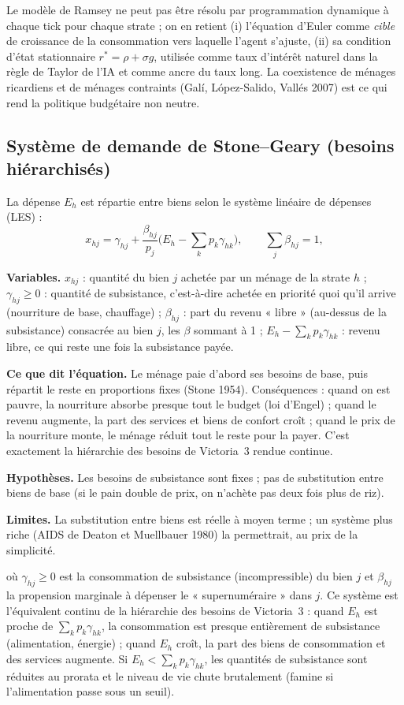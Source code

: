 \documentclass[11pt,a4paper]{article}
\newcommand{\og}{« }
\newcommand{\fg}{ »}
\newcommand{\variables}{\par\noindent\textbf{Variables.} }
\newcommand{\sens}{\par\noindent\textbf{Ce que dit l'équation.} }
\newcommand{\hyp}{\par\noindent\textbf{Hypothèses.} }
\newcommand{\limites}{\par\noindent\textbf{Limites.} }
\begin{document}
\begin{lit}
Le modèle de Ramsey ne peut pas être résolu par programmation dynamique à chaque tick pour chaque strate ; on en retient (i) l'équation d'Euler comme \emph{cible} de croissance de la consommation vers laquelle l'agent s'ajuste, (ii) sa condition d'état stationnaire $r^\ast = \rho + \sigma g$, utilisée comme taux d'intérêt naturel dans la règle de Taylor de l'IA et comme ancre du taux long. La coexistence de ménages ricardiens et de ménages contraints (Galí, López-Salido, Vallés 2007) est ce qui rend la politique budgétaire non neutre.
\end{lit}

\subsection{Système de demande de Stone--Geary (besoins hiérarchisés)}
La dépense $E_h$ est répartie entre biens selon le système linéaire de dépenses (LES) :
\begin{equation}
x_{hj} = \gamma_{hj} + \frac{\beta_{hj}}{p_j}\Big(E_h - \sum_k p_k \gamma_{hk}\Big), \qquad \sum_j \beta_{hj} = 1,
\label{eq:les}
\end{equation}
\begin{lecture}
\variables $x_{hj}$ : quantité du bien $j$ achetée par un ménage de la strate $h$ ; $\gamma_{hj}\ge0$ : quantité de subsistance, c'est-à-dire achetée en priorité quoi qu'il arrive (nourriture de base, chauffage) ; $\beta_{hj}$ : part du revenu « libre » (au-dessus de la subsistance) consacrée au bien $j$, les $\beta$ sommant à 1 ; $E_h - \sum_k p_k\gamma_{hk}$ : revenu libre, ce qui reste une fois la subsistance payée.
\sens Le ménage paie d'abord ses besoins de base, puis répartit le reste en proportions fixes (Stone 1954). Conséquences : quand on est pauvre, la nourriture absorbe presque tout le budget (loi d'Engel) ; quand le revenu augmente, la part des services et biens de confort croît ; quand le prix de la nourriture monte, le ménage réduit tout le reste pour la payer. C'est exactement la hiérarchie des besoins de Victoria~3 rendue continue.
\hyp Les besoins de subsistance sont fixes ; pas de substitution entre biens de base (si le pain double de prix, on n'achète pas deux fois plus de riz).
\limites La substitution entre biens est réelle à moyen terme ; un système plus riche (AIDS de Deaton et Muellbauer 1980) la permettrait, au prix de la simplicité.
\end{lecture}
où $\gamma_{hj} \ge 0$ est la consommation de subsistance (incompressible) du bien $j$ et $\beta_{hj}$ la propension marginale à dépenser le \og supernuméraire\fg{} dans $j$. Ce système est l'équivalent continu de la hiérarchie des besoins de Victoria~3 : quand $E_h$ est proche de $\sum_k p_k\gamma_{hk}$, la consommation est presque entièrement de subsistance (alimentation, énergie) ; quand $E_h$ croît, la part des biens de consommation et des services augmente. Si $E_h < \sum_k p_k \gamma_{hk}$, les quantités de subsistance sont réduites au prorata et le niveau de vie chute brutalement (famine si l'alimentation passe sous un seuil).
\end{document}
